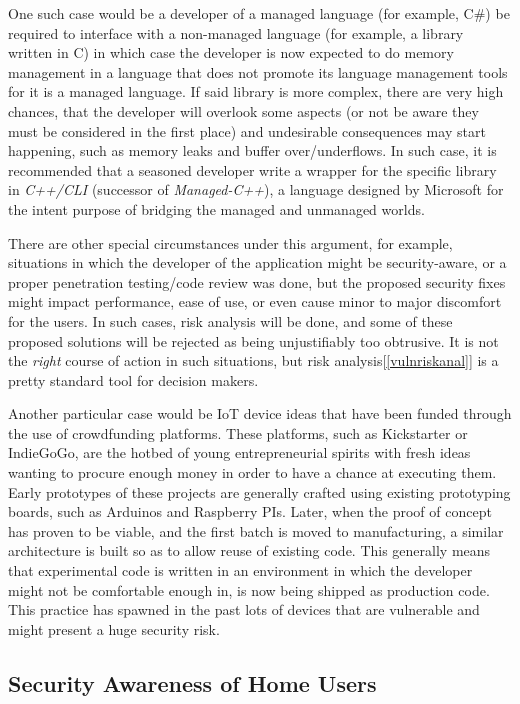 \documentclass[a4paper,12pt]{article}
\begin{document}
	One such case would be a developer of a managed language (for example, C\#) be required to interface with a non-managed language (for example, a library written in C) in which case the developer is now expected to do memory management in a language that does not promote its language management tools for it is a managed language. If said library is more complex, there are very high chances, that the developer will overlook some aspects (or not be aware they must be considered in the first place) and undesirable consequences may start happening, such as memory leaks and buffer over/underflows. In such case, it is recommended that a seasoned developer write a wrapper for the specific library in \textit{C++/CLI} (successor of \textit{Managed-C++}), a language designed by Microsoft for the intent purpose\cite{hstutter06} of bridging the managed and unmanaged worlds.
	
	There are other special circumstances under this argument, for example, situations in which the developer of the application might be security-aware, or a proper penetration testing/code review was done, but the proposed security fixes might impact performance, ease of use, or even cause minor to major discomfort for the users. In such cases, risk analysis will be done, and some of these proposed solutions will be rejected as being unjustifiably too obtrusive. It is not the \textit{right} course of action in such situations, but risk analysis[\ref{vulnriskanal}] is a pretty standard tool for decision makers.
	
	Another particular case would be IoT device ideas that have been funded through the use of crowdfunding platforms. These platforms, such as Kickstarter or IndieGoGo, are the hotbed of young entrepreneurial spirits with fresh ideas wanting to procure enough money in order to have a chance at executing them. Early prototypes of these projects are generally crafted using existing prototyping boards, such as Arduinos and Raspberry PIs. Later, when the proof of concept has proven to be viable, and the first batch is moved to manufacturing, a similar architecture is built so as to allow reuse of existing code. This generally means that experimental code is written in an environment in which the developer might not be comfortable enough in, is now being shipped as production code. This practice has spawned in the past lots of devices that are vulnerable and might present a huge security risk.\cite{mstan14}
	
\subsection{Security Awareness of Home Users}
 
	
\end{document}
